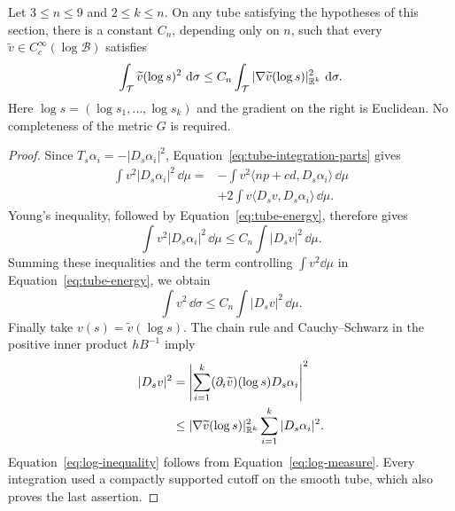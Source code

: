 \begin{proposition}\label{prop:log-inequality}
Let $3\le n\le9$ and $2\le k\le n$.  On any tube satisfying the
hypotheses of this section, there is a constant $C_n$, depending only
on $n$, such that every
$\widetilde v\in C_c^\infty(\log\mathcal B)$ satisfies
\begin{equation}\label{eq:log-inequality}
 \int_{\mathcal T}\widetilde v(\log s)^2\,\mathop{}\!\mathrm d\sigma
 \le C_n\int_{\mathcal T}
       |\nabla\widetilde v(\log s)|_{\mathbb R^k}^2\,\mathop{}\!\mathrm d\sigma.
\end{equation}
Here $\log s=(\log s_1,\ldots,\log s_k)$ and the gradient on the right
is Euclidean.  No completeness of the metric $G$ is required.
\end{proposition}

\begin{proof}
Since $T_s\alpha_i=-|D_s\alpha_i|^2$,
Equation~\eqref{eq:tube-integration-parts} gives
\[
 \begin{split}
 \int v^2|D_s\alpha_i|^2\,\dd\mu
 ={}&-\int v^2\langle np+cd,D_s\alpha_i\rangle\,\dd\mu\\
    &+2\int v\langle D_sv,D_s\alpha_i\rangle\,\dd\mu.
 \end{split}
\]
Young's inequality, followed by Equation~\eqref{eq:tube-energy},
therefore gives
\[
 \int v^2|D_s\alpha_i|^2\,\dd\mu
 \le C_n\int|D_sv|^2\,\dd\mu.
\]
Summing these inequalities and the term controlling $\int v^2\dd\mu$
in Equation~\eqref{eq:tube-energy}, we obtain
\[
 \int v^2\,\dd\sigma\le C_n\int|D_sv|^2\,\dd\mu.
\]
Finally take $v(s)=\widetilde v(\log s)$.  The chain rule and
Cauchy--Schwarz in the positive inner product $hB^{-1}$ imply
\[
 \begin{split}
 |D_sv|^2
 &=\left|\sum_{i=1}^k
       (\partial_i\widetilde v)(\log s)D_s\alpha_i\right|^2\\
 &\le |\nabla\widetilde v(\log s)|_{\mathbb R^k}^2
       \sum_{i=1}^k|D_s\alpha_i|^2.
 \end{split}
\]
Equation~\eqref{eq:log-inequality} follows from
Equation~\eqref{eq:log-measure}.  Every integration used a compactly
supported cutoff on the smooth tube, which also proves the last
assertion.
\end{proof}
